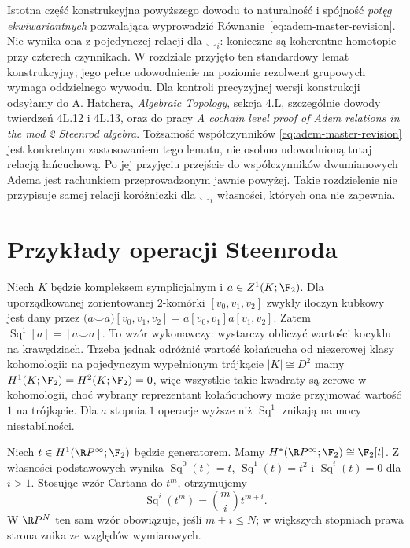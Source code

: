 \begin{uwaga}
Istotna część konstrukcyjna powyższego dowodu to
naturalność i spójność \emph{potęg ekwiwariantnych}
pozwalająca wyprowadzić
Równanie~\ref{eq:adem-master-revision}.
Nie wynika ona z pojedynczej relacji dla $\smile_i$:
konieczne są koherentne homotopie przy czterech
czynnikach. W rozdziale przyjęto ten standardowy
lemat konstrukcyjny; jego pełne udowodnienie
na poziomie rezolwent grupowych wymaga oddzielnego
wywodu. Dla kontroli precyzyjnej wersji konstrukcji
odsyłamy do A. Hatchera, \emph{Algebraic Topology},
sekcja 4.L, szczególnie dowody twierdzeń 4L.12 i 4L.13,
oraz do pracy \emph{A cochain level proof of Adem relations
in the mod 2 Steenrod algebra}.
Tożsamość współczynników
\eqref{eq:adem-master-revision} jest
konkretnym zastosowaniem tego lematu, nie
osobno udowodnioną tutaj relacją łańcuchową.
Po jej przyjęciu przejście do współczynników
dwumianowych Adema jest rachunkiem
przeprowadzonym jawnie powyżej.
Takie rozdzielenie nie przypisuje samej
relacji koróżniczki dla $\smile_i$
własności, których ona nie zapewnia.
\end{uwaga}

\section{Przykłady operacji Steenroda}

\begin{przyklad}
Niech $K$ będzie kompleksem symplicjalnym i
$a\in Z^1(K;\F_2)$. Dla uporządkowanej
zorientowanej $2$-komórki $[v_0,v_1,v_2]$
zwykły iloczyn kubkowy jest dany przez
$\bigl(a\smile a\bigr)[v_0,v_1,v_2]
=a[v_0,v_1]a[v_1,v_2]$. Zatem
$\operatorname{Sq}^1[a]=[a\smile a]$.
To wzór wykonawczy: wystarczy obliczyć wartości
kocyklu na krawędziach. Trzeba jednak odróżnić
wartość kołańcucha od niezerowej klasy kohomologii:
na pojedynczym wypełnionym trójkącie $|K|\cong D^2$
mamy $H^1(K;\F_2)=H^2(K;\F_2)=0$, więc
wszystkie takie kwadraty są zerowe w kohomologii,
choć wybrany reprezentant kołańcuchowy może
przyjmować wartość $1$ na trójkącie. Dla $a$ stopnia $1$
operacje wyższe niż $\operatorname{Sq}^1$ znikają
na mocy niestabilności.
\end{przyklad}

\begin{przyklad}
Niech $t\in H^1(\R P^\infty;\F_2)$ będzie generatorem.
Mamy $H^*(\R P^\infty;\F_2)\cong\F_2[t]$.
Z własności podstawowych wynika
$\operatorname{Sq}^0(t)=t$,
$\operatorname{Sq}^1(t)=t^2$ i
$\operatorname{Sq}^i(t)=0$ dla $i>1$.
Stosując wzór Cartana do $t^m$, otrzymujemy
\[
\operatorname{Sq}^i(t^m)=\binom mi t^{m+i}.
\]
W $\R P^N$ ten sam wzór obowiązuje, jeśli
$m+i\le N$; w większych stopniach prawa strona
znika ze względów wymiarowych.
\end{przyklad}

